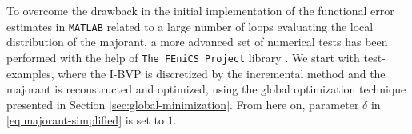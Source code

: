 To overcome the drawback in the initial implementation of the functional error
estimates in \verb+MATLAB+ related to a large number of loops evaluating the local 
distribution of the majorant, a more 
advanced set of numerical tests has been performed with the help of 
\verb+The FEniCS Project+ library \cite{Fenicsproject, LoggMardalWells2012}.
%
We start with test-examples, where the I-BVP is discretized by the incremental method and 
the majorant is reconstructed and optimized, 
using the global optimization technique presented in Section \ref{sec:global-minimization}. From here on, parameter $\delta$ in 
\eqref{eq:majorant-simplified} is set to $1$. 

